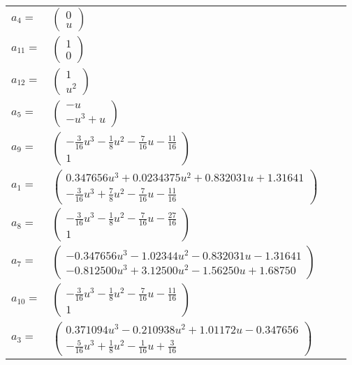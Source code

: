 \documentclass[1p]{elsarticle_modified}
\theoremstyle{definition}
\begin{document}
\begin{tabular}{m{7pt} m{180pt} m{7pt} m{180pt} }
\flushright $a_{4}=$&$\begin{pmatrix}0\\u\end{pmatrix}$ \\
\flushright $a_{11}=$&$\begin{pmatrix}1\\0\end{pmatrix}$ \\
\flushright $a_{12}=$&$\begin{pmatrix}1\\u^2\end{pmatrix}$ \\
\flushright $a_{5}=$&$\begin{pmatrix}- u\\- u^3+u\end{pmatrix}$ \\
\flushright $a_{9}=$&$\begin{pmatrix}-\frac{3}{16} u^3-\frac{1}{8} u^2-\frac{7}{16} u-\frac{11}{16}\\1\end{pmatrix}$ \\
\flushright $a_{1}=$&$\begin{pmatrix}0.347656 u^{3}+0.0234375 u^{2}+0.832031 u+1.31641\\-\frac{3}{16} u^3+\frac{7}{8} u^2-\frac{7}{16} u-\frac{11}{16}\end{pmatrix}$ \\
\flushright $a_{8}=$&$\begin{pmatrix}-\frac{3}{16} u^3-\frac{1}{8} u^2-\frac{7}{16} u-\frac{27}{16}\\1\end{pmatrix}$ \\
\flushright $a_{7}=$&$\begin{pmatrix}-0.347656 u^{3}-1.02344 u^{2}-0.832031 u-1.31641\\-0.812500 u^{3}+3.12500 u^{2}-1.56250 u+1.68750\end{pmatrix}$ \\
\flushright $a_{10}=$&$\begin{pmatrix}-\frac{3}{16} u^3-\frac{1}{8} u^2-\frac{7}{16} u-\frac{11}{16}\\1\end{pmatrix}$ \\
\flushright $a_{3}=$&$\begin{pmatrix}0.371094 u^{3}-0.210938 u^{2}+1.01172 u-0.347656\\-\frac{5}{16} u^3+\frac{1}{8} u^2-\frac{1}{16} u+\frac{3}{16}\end{pmatrix}$ \\

\end{tabular}
\end{document}

